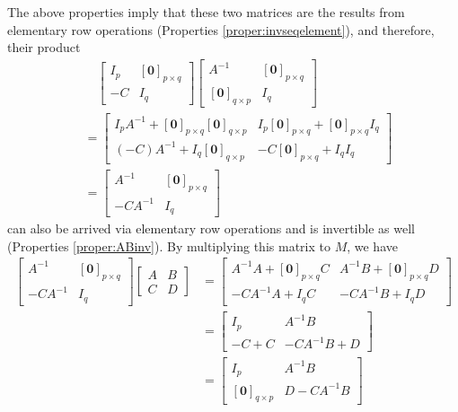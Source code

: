 The above properties imply that these two matrices are the results from elementary row operations (Properties \ref{proper:invseqelement}), and therefore, their product
\begin{align*}
&\quad \begin{bmatrix}
I_p & [\textbf{0}]_{p \times q} \\
-C & I_q
\end{bmatrix}
\begin{bmatrix}
A^{-1} & [\textbf{0}]_{p\times q} \\
[\textbf{0}]_{q\times p} & I_q
\end{bmatrix} \\
&=
\begin{bmatrix}
I_pA^{-1} + [\textbf{0}]_{p\times q}[\textbf{0}]_{q\times p} & I_p[\textbf{0}]_{p\times q} + [\textbf{0}]_{p\times q}I_q \\
(-C)A^{-1} + I_q[\textbf{0}]_{q \times p} & -C[\textbf{0}]_{p \times q} + I_qI_q
\end{bmatrix} \\
&=
\begin{bmatrix}
A^{-1} & [\textbf{0}]_{p\times q} \\
-CA^{-1} & I_q
\end{bmatrix}
\end{align*}
can also be arrived via elementary row operations and is invertible as well (Properties \ref{proper:ABinv}). By multiplying this matrix to $M$, we have
\begin{align*}
\begin{bmatrix}
A^{-1} & [\textbf{0}]_{p\times q} \\
-CA^{-1} & I_q
\end{bmatrix}
\begin{bmatrix}
A & B \\
C & D
\end{bmatrix} &= 
\begin{bmatrix}
A^{-1}A + [\textbf{0}]_{p\times q}C & A^{-1}B + [\textbf{0}]_{p \times q}D \\
-CA^{-1}A + I_qC & - CA^{-1}B + I_qD  
\end{bmatrix} \\
&= 
\begin{bmatrix}
I_p & A^{-1}B \\
-C + C & - CA^{-1}B + D  
\end{bmatrix} \\
&=
\begin{bmatrix}
I_p & A^{-1}B \\
[\textbf{0}]_{q\times p} & D - CA^{-1}B 
\end{bmatrix}
\end{align*}
